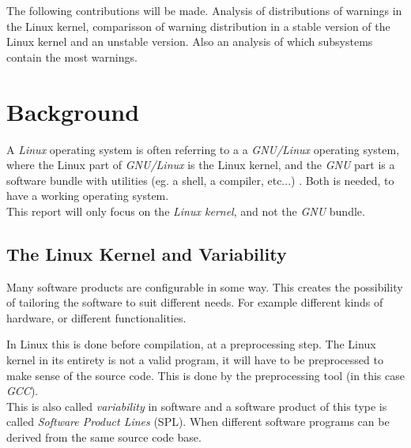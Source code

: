 \documentclass[a4paper,11pt]{report}
\begin{document}
The following contributions will be made. Analysis of distributions of
warnings in the Linux kernel, comparisson of warning distribution in a stable
version of the Linux kernel and an unstable version. Also an analysis of which
subsystems contain the most warnings.

\newpage
        \chapter{Background}

A \emph{Linux} operating system is often referring to a a \emph{GNU/Linux} 
operating system, where the Linux part of \emph{GNU/Linux} is the Linux kernel, 
and the \emph{GNU} part is a software bundle with utilities (eg. a shell, a 
compiler, etc...) \cite{gnupack}. Both is 
needed, to have a working operating system. 
\\

This report will only focus on the \emph{Linux kernel}, and not the \emph{GNU} 
bundle.


        \section{The Linux Kernel and Variability}

Many software products are configurable in some way. This creates the 
possibility of tailoring the software to suit different needs. For example 
different kinds of hardware, or different functionalities. 

In Linux this is done before compilation, at a preprocessing step. The Linux 
kernel in its entirety is not a valid program, it will have to be preprocessed 
to make sense of the source code.
This is done by the preprocessing tool (in this case \emph{GCC}).
    \cite[p. 1]{IntDatSPL}
\\

This is also called \emph{variability} in software and a software product of 
this type is called \emph{Software Product Lines} (SPL). When different 
software programs can be derived from the same source code base. 
\end{document}
